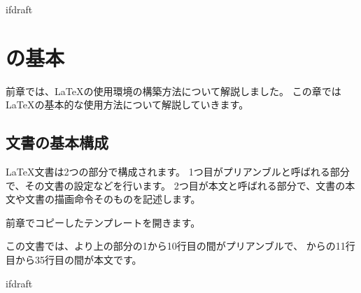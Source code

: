 \expandafter\ifx\csname ifdraft\endcsname\relax
    
	\graphicspath{{./figure/}}

\fi

\chapter{\logoLaTeX の基本}
    前章では、\LaTeX の使用環境の構築方法について解説しました。
    この章では\LaTeX の基本的な使用方法について解説していきます。

    \section{\logoLaTeX 文書の基本構成}
        \LaTeX 文書は2つの部分で構成されます。
        1つ目がプリアンブルと呼ばれる部分で、その文書の設定などを行います。
        2つ目が本文と呼ばれる部分で、文書の本文や文書の描画命令そのものを記述します。

        前章でコピーしたテンプレートを開きます。

        この文書では、\url{}より上の部分の1から10行目の間がプリアンブルで、
        \url{}から\url{}の11行目から35行目の間が本文です。
        
		
		\expandafter\ifx\csname ifdraft\endcsname\relax

\fi